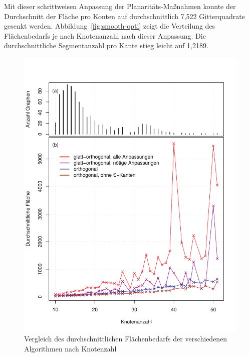 \documentclass[a4paper]{scrreprt}
\theoremstyle{definition}
\begin{document}
Mit dieser schrittweisen Anpassung der Planaritäts-Maßnahmen konnte der Durchschnitt der Fläche pro Konten auf durchschnittlich 7,522 Gitterquadrate gesenkt werden. Abbildung~\ref{fig:smooth-opti} zeigt die Verteilung des Flächenbedarfs je nach Knotenanzahl nach dieser Anpassung. Die durchschnittliche Segmentanzahl pro Kante stieg leicht auf 1,2189.








\begin{figure}[p]
  \centering
  \includegraphics[width=\textwidth]{area_comparison}
  \caption{Vergleich des durchschnittlichen Flächenbedarfs der verschiedenen Algorithmen nach Knotenzahl}
  \label{fig:areaComparison}
\end{figure}
\end{document}
